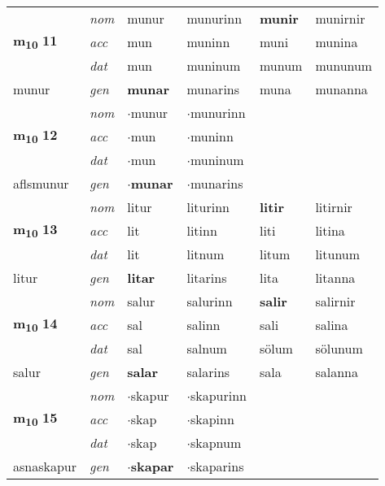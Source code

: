 \begin{longtable}[l]{llllll}
\multirow{3}{*}{{{\textbf{m{\textsubscript{10}}} \Large{\textbf{11}}}}}  & {\footnotesize{{\textit{nom}}}} & munur & munurinn    & \textbf{munir} & munirnir  \\*
 &  {\footnotesize{{\textit{acc}}}} & mun  & muninn   & muni  & munina \\*
 &  {\footnotesize{{\textit{dat}}}} & mun & muninum   & munum & mununum \\*
 {\footnotesize{munur}} &   {\footnotesize{{\textit{gen}}}} & \textbf{munar}  & munarins  & muna & munanna \\
\cmidrule{1-6}


\multirow{3}{*}{{{\textbf{m{\textsubscript{10}}} \Large{\textbf{12}}}}}  & {\footnotesize{{\textit{nom}}}} & $\cdot$munur & $\cdot$munurinn    & \textbf{} &   \\*
 &  {\footnotesize{{\textit{acc}}}} & $\cdot$mun  & $\cdot$muninn   &   &  \\*
 &  {\footnotesize{{\textit{dat}}}} & $\cdot$mun & $\cdot$muninum   &  &  \\*
 {\footnotesize{aflsmunur}} &   {\footnotesize{{\textit{gen}}}} & \textbf{$\cdot$munar}  & $\cdot$munarins  &  &  \\
\cmidrule{1-6}


\multirow{3}{*}{{{\textbf{m{\textsubscript{10}}} \Large{\textbf{13}}}}}  & {\footnotesize{{\textit{nom}}}} & litur & liturinn    & \textbf{litir} & litirnir  \\*
 &  {\footnotesize{{\textit{acc}}}} & lit  & litinn   & liti  & litina \\*
 &  {\footnotesize{{\textit{dat}}}} & lit & litnum   & litum & litunum \\*
 {\footnotesize{litur}} &   {\footnotesize{{\textit{gen}}}} & \textbf{litar}  & litarins  & lita & litanna \\
\cmidrule{1-6}


\multirow{3}{*}{{{\textbf{m{\textsubscript{10}}} \Large{\textbf{14}}}}}  & {\footnotesize{{\textit{nom}}}} & salur & salurinn    & \textbf{salir} & salirnir  \\*
 &  {\footnotesize{{\textit{acc}}}} & sal  & salinn   & sali  & salina \\*
 &  {\footnotesize{{\textit{dat}}}} & sal & salnum   & sölum & sölunum \\*
 {\footnotesize{salur}} &   {\footnotesize{{\textit{gen}}}} & \textbf{salar}  & salarins  & sala & salanna \\
\cmidrule{1-6}


\multirow{3}{*}{{{\textbf{m{\textsubscript{10}}} \Large{\textbf{15}}}}}  & {\footnotesize{{\textit{nom}}}} & $\cdot$skapur & $\cdot$skapurinn    & \textbf{} &   \\*
 &  {\footnotesize{{\textit{acc}}}} & $\cdot$skap  & $\cdot$skapinn   &   &  \\*
 &  {\footnotesize{{\textit{dat}}}} & $\cdot$skap & $\cdot$skapnum   &  &  \\*
 {\footnotesize{asnaskapur}} &   {\footnotesize{{\textit{gen}}}} & \textbf{$\cdot$skapar}  & $\cdot$skaparins  &  &  \\
\cmidrule{1-6}



\end{longtable}
